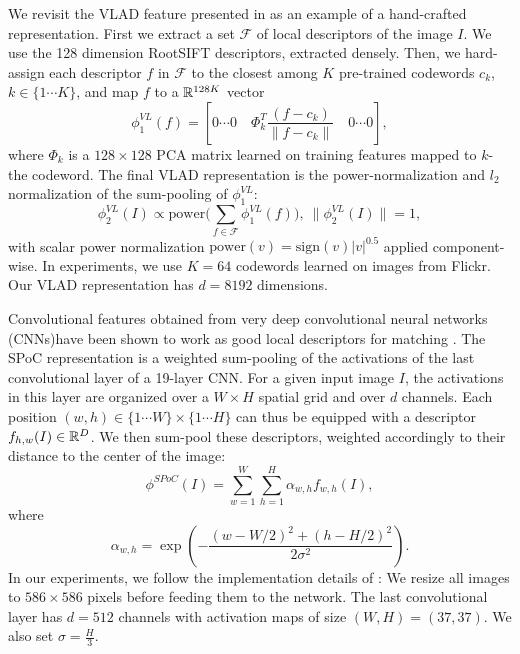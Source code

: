 We revisit the VLAD feature presented in \cite{VLAD} as an example of a hand-crafted representation. First we extract a set $\mathcal{F}$ of local descriptors of the image $I$. We use the 128 dimension RootSIFT \cite{3things} descriptors, extracted densely. 
Then, we hard-assign each descriptor $f$ in $\mathcal{F}$ to the closest among $K$ pre-trained codewords $c_k$, $k\in\{1\cdots K\}$,
and map $f$ to a $\mathbb R^{128K}$ vector 
\begin{equation}
\phi^{VL}_1(f) = \left[0 \cdots 0\quad \Phi_k^T\frac{(f-c_k)}{\|f-c_k\|} \quad 0 \cdots 0\right],
\end{equation}
where $\Phi_k$ is a $128\times 128$ PCA matrix learned on training features mapped to $k$-the codeword.
The final VLAD representation is the power-normalization and $l_2$ normalization of the sum-pooling of $\phi^{VL}_1$:
\begin{equation}
\phi^{VL}_2(I) \propto \mathrm{power}\big(\sum_{f\in \mathcal{F}}\phi^{VL}_1(f)\big),~\|\phi^{VL}_2(I)\|=1,
\end{equation}
with scalar power normalization $\mathrm{power}(v)=\mathrm{sign}(v)|v|^{0.5}$ applied component-wise.
In experiments, we use $K=64$ codewords learned on images from Flickr. Our VLAD representation has $d=8192$ dimensions.

Convolutional features obtained from very deep convolutional neural networks (CNNs)have been shown to work as good local descriptors for matching \cite{SimonZisser15}. The SPoC representation \cite{babenko15} is a weighted sum-pooling of the activations of the last convolutional layer of a 19-layer CNN. For a given input image $I$, the activations in this layer are organized over a $W\times H$ spatial grid and over $d$ channels. Each position $(w,h)\in \{1 \cdots W\}\times \{1\cdots H\}$ can thus be equipped with a descriptor $f_{h,w}(I)\in\mathbb R^D$. 
We then sum-pool these descriptors, weighted accordingly to their distance to the center of the image:
\begin{equation}
    \phi^{SPoC}(I) = \sum_{w=1}^W\sum_{h=1}^H \alpha_{w,h}f_{w,h}(I),
\end{equation}
where
\begin{equation}
    \alpha_{w,h} = \exp \left(-\dfrac{(w-W/2)^2+(h-H/2)^2}{2\sigma^2}\right).
\end{equation}
In our experiments, we follow the implementation details of \cite{babenko15}: We resize all images to $586\times 586$ pixels before feeding them to the network. The last convolutional layer has $d=512$ channels with activation maps of size $(W,H)=(37,37)$. We also set $\sigma=\frac{H}{3}$.

